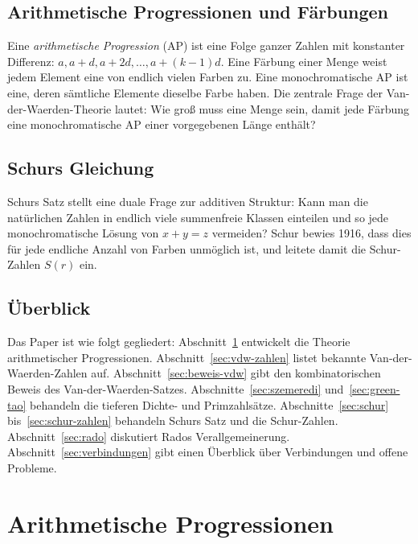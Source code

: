 \documentclass[12pt,a4paper]{amsart}
\theoremstyle{definition}
\begin{document}
\subsection*{Arithmetische Progressionen und Färbungen}

Eine \emph{arithmetische Progression} (AP) ist eine Folge ganzer Zahlen mit konstanter
Differenz: $a, a+d, a+2d, \ldots, a+(k-1)d$. Eine Färbung einer Menge weist jedem
Element eine von endlich vielen Farben zu. Eine monochromatische AP ist eine, deren
sämtliche Elemente dieselbe Farbe haben. Die zentrale Frage der Van-der-Waerden-Theorie
lautet: Wie groß muss eine Menge sein, damit jede Färbung eine monochromatische AP
einer vorgegebenen Länge enthält?

\subsection*{Schurs Gleichung}

Schurs Satz stellt eine duale Frage zur additiven Struktur: Kann man die natürlichen
Zahlen in endlich viele summenfreie Klassen einteilen und so jede monochromatische
Lösung von $x + y = z$ vermeiden? Schur bewies 1916, dass dies für jede endliche
Anzahl von Farben unmöglich ist, und leitete damit die Schur-Zahlen $S(r)$ ein.

\subsection*{Überblick}

Das Paper ist wie folgt gegliedert: Abschnitt~\ref{sec:ap} entwickelt die Theorie
arithmetischer Progressionen. Abschnitt~\ref{sec:vdw-zahlen} listet bekannte
Van-der-Waerden-Zahlen auf. Abschnitt~\ref{sec:beweis-vdw} gibt den kombinatorischen
Beweis des Van-der-Waerden-Satzes. Abschnitte~\ref{sec:szemeredi} und~\ref{sec:green-tao}
behandeln die tieferen Dichte- und Primzahlsätze. Abschnitte~\ref{sec:schur}
bis~\ref{sec:schur-zahlen} behandeln Schurs Satz und die Schur-Zahlen. Abschnitt~\ref{sec:rado}
diskutiert Rados Verallgemeinerung. Abschnitt~\ref{sec:verbindungen} gibt einen
Überblick über Verbindungen und offene Probleme.

\section{Arithmetische Progressionen}\label{sec:ap}
\end{document}

